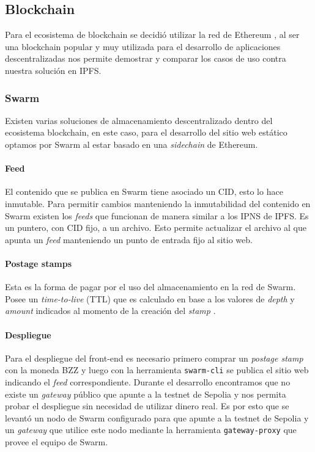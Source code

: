 \subsection{Blockchain}

Para el ecosistema de blockchain se decidió utilizar la red de Ethereum \cite{wood2014ethereum}, al ser una blockchain popular y muy utilizada para el desarrollo de aplicaciones descentralizadas nos permite demostrar y comparar los casos de uso contra nuestra solución en IPFS.

\subsubsection{Swarm}

Existen varias soluciones de almacenamiento descentralizado dentro del ecosistema blockchain, en este caso, para el desarrollo del sitio web estático optamos por Swarm al estar basado en una \textit{sidechain} de Ethereum.

\paragraph{Feed} El contenido que se publica en Swarm tiene asociado un CID, esto lo hace inmutable. Para permitir cambios manteniendo la inmutabilidad del contenido en Swarm existen los \textit{feeds} que funcionan de manera similar a los IPNS de IPFS. Es un puntero, con CID fijo, a un archivo. Esto permite actualizar el archivo al que apunta un \textit{feed} manteniendo un punto de entrada fijo al sitio web.

\paragraph{Postage stamps} Esta es la forma de pagar por el uso del almacenamiento en la red de Swarm. Posee un \textit{time-to-live} (TTL) que es calculado en base a los valores de \textit{depth} y \textit{amount} indicados al momento de la creación del \textit{stamp} \cite{swarm-postage-stamps}.

\paragraph{Despliegue} Para el despliegue del front-end es necesario primero comprar un \textit{postage stamp} con la moneda BZZ y luego con la herramienta \texttt{swarm-cli} \cite{swarm-cli} se publica el sitio web indicando el \textit{feed} correspondiente. Durante el desarrollo encontramos que no existe un \textit{gateway} público que apunte a la testnet de Sepolia y nos permita probar el despliegue sin necesidad de utilizar dinero real. Es por esto que se levantó un nodo de Swarm configurado para que apunte a la testnet de Sepolia y un \textit{gateway} que utilice este nodo mediante la herramienta \texttt{gateway-proxy} \cite{gateway-proxy} que provee el equipo de Swarm.

